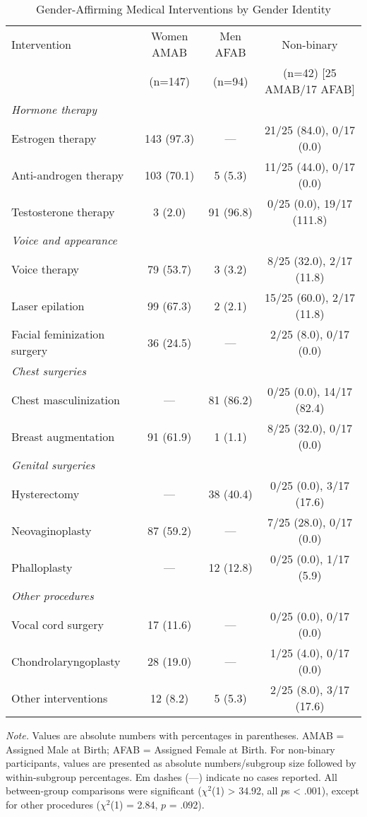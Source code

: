 \documentclass[12pt,a4paper]{article}
\begin{document}
\begin{table}[htbp]
\centering
\caption{Gender-Affirming Medical Interventions by Gender Identity}
\begin{tabular}{lccc}
\toprule
Intervention & Women AMAB & Men AFAB & Non-binary\\
& (n=147) & (n=94) & (n=42) [25 AMAB/17 AFAB]\\
\midrule
\multicolumn{4}{l}{\textit{Hormone therapy}}\\
\quad Estrogen therapy & 143 (97.3) & — & 21/25 (84.0), 0/17 (0.0)\\
\quad Anti-androgen therapy & 103 (70.1) & 5 (5.3) & 11/25 (44.0), 0/17 (0.0)\\
\quad Testosterone therapy & 3 (2.0) & 91 (96.8) & 0/25 (0.0), 19/17 (111.8)\\
\midrule
\multicolumn{4}{l}{\textit{Voice and appearance}}\\
\quad Voice therapy & 79 (53.7) & 3 (3.2) & 8/25 (32.0), 2/17 (11.8)\\
\quad Laser epilation & 99 (67.3) & 2 (2.1) & 15/25 (60.0), 2/17 (11.8)\\
\quad Facial feminization surgery & 36 (24.5) & — & 2/25 (8.0), 0/17 (0.0)\\
\midrule
\multicolumn{4}{l}{\textit{Chest surgeries}}\\
\quad Chest masculinization & — & 81 (86.2) & 0/25 (0.0), 14/17 (82.4)\\
\quad Breast augmentation & 91 (61.9) & 1 (1.1) & 8/25 (32.0), 0/17 (0.0)\\
\midrule
\multicolumn{4}{l}{\textit{Genital surgeries}}\\
\quad Hysterectomy & — & 38 (40.4) & 0/25 (0.0), 3/17 (17.6)\\
\quad Neovaginoplasty & 87 (59.2) & — & 7/25 (28.0), 0/17 (0.0)\\
\quad Phalloplasty & — & 12 (12.8) & 0/25 (0.0), 1/17 (5.9)\\
\midrule
\multicolumn{4}{l}{\textit{Other procedures}}\\
\quad Vocal cord surgery & 17 (11.6) & — & 0/25 (0.0), 0/17 (0.0)\\
\quad Chondrolaryngoplasty & 28 (19.0) & — & 1/25 (4.0), 0/17 (0.0)\\
\quad Other interventions & 12 (8.2) & 5 (5.3) & 2/25 (8.0), 3/17 (17.6)\\
\bottomrule
\end{tabular}
\begin{tablenotes}
\small
\item \textit{Note.} Values are absolute numbers with percentages in parentheses. AMAB = Assigned Male at Birth; AFAB = Assigned Female at Birth. For non-binary participants, values are presented as absolute numbers/subgroup size followed by within-subgroup percentages. Em dashes (—) indicate no cases reported. All between-group comparisons were significant ($\chi^2$(1) > 34.92, all $p$s < .001), except for other procedures ($\chi^2$(1) = 2.84, $p$ = .092).
\end{tablenotes}
\end{table}
\end{document}
